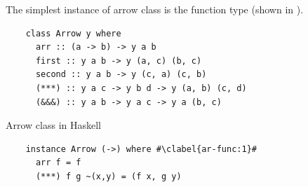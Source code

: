 The simplest instance of arrow class is the function type (shown in ). 
\begin{code}
  \begin{verbatim}
    class Arrow y where 
      arr :: (a -> b) -> y a b
      first :: y a b -> y (a, c) (b, c)
      second :: y a b -> y (c, a) (c, b)
      (***) :: y a c -> y b d -> y (a, b) (c, d)
      (&&&) :: y a b -> y a c -> y a (b, c)
  \end{verbatim}
  \caption{Arrow class in Haskell}
  \label{b:ar:c1}
\end{code}
\begin{code}
  \begin{verbatim}
    instance Arrow (->) where #\clabel{ar-func:1}#
      arr f = f
      (***) f g ~(x,y) = (f x, g y)
  \end{verbatim}
  \label{b:ar:c2}
\end{code}
